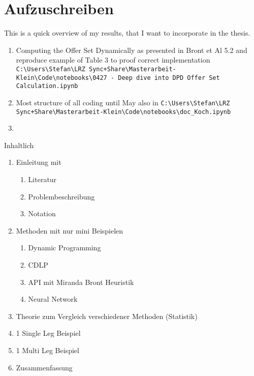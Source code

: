 \chapter{Aufzuschreiben}

This is a quick overview of my results, that I want to incorporate in the thesis.

\begin{enumerate}
	\item Computing the Offer Set Dynamically as presented in Bront et Al 5.2 and reproduce example of Table 3 to proof correct implementation \texttt{C:\textbackslash  Users\textbackslash  Stefan\textbackslash  LRZ Sync+Share\textbackslash  Masterarbeit-Klein\textbackslash  Code\textbackslash  notebooks\textbackslash  0427 - Deep dive into DPD Offer Set Calculation.ipynb}
	\item Most structure of all coding until May also in \texttt{C:\textbackslash  Users\textbackslash  Stefan\textbackslash  LRZ Sync+Share\textbackslash  Masterarbeit-Klein\textbackslash  Code\textbackslash  notebooks\textbackslash  doc\_Koch.ipynb}
\item \end{enumerate}

\newpage
Inhaltlich

\begin{enumerate}
	\item Einleitung mit 
	\begin{enumerate}
		\item Literatur
		\item Problembeschreibung
		\item Notation
	\end{enumerate} 
	\item Methoden mit nur mini Beispielen
	\begin{enumerate}
		\item Dynamic Programming
		\item CDLP
		\item API mit Miranda Bront Heuristik
		\item Neural Network
	\end{enumerate}
	\item Theorie zum Vergleich verschiedener Methoden (Statistik)
	\item 1 Single Leg Beispiel
	\item 1 Multi Leg Beispiel
	\item Zusammenfassung
\end{enumerate}